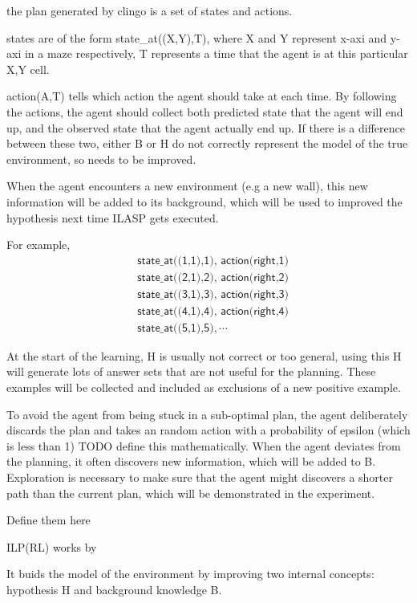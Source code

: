 the plan generated by clingo is a set of states and actions.

states are of the form state\_at((X,Y),T), where X and Y represent x-axi and y-axi in a maze respectively, T represents a time that the agent is at
this particular X,Y cell.

action(A,T) tells which action the agent should take at each time. By following the actions, the agent should collect both predicted state that the
agent will end up, and the observed state that the agent actually end up. If there is a difference between these two, either B or H do not correctly represent
the model of the true environment, so needs to be improved.

When the agent encounters a new environment (e.g a new wall), this new information will be added to its background, which will be used to improved the hypothesis
next time ILASP gets executed.

For example,
\begin{equation*}
\begin{split}
&\textsf{state\_at((1,1),1), action(right,1)}\\
&\textsf{state\_at((2,1),2), action(right,2)}\\
&\textsf{state\_at((3,1),3), action(right,3)}\\
&\textsf{state\_at((4,1),4), action(right,4)}\\
&\textsf{state\_at((5,1),5)}, \cdots
\end{split}
\end{equation*}

At the start of the learning, H is usually not correct or too general, using this H will generate lots of answer sets that are not useful for the planning.
These examples will be collected and included as exclusions of a new positive example.


To avoid the agent from being stuck in a sub-optimal plan, the agent deliberately discards the plan and takes an random action with a probability of
epsilon (which is less than 1) TODO define this mathematically.
When the agent deviates from the planning, it often discovers new information, which will be added to B.
Exploration is necessary to make sure that the agent might discovers a shorter path than the current plan, which will be demonstrated in the experiment.

Define them here

ILP(RL) works by

It buids the model of the environment by improving two internal concepts: hypothesis H and background knowledge B.

